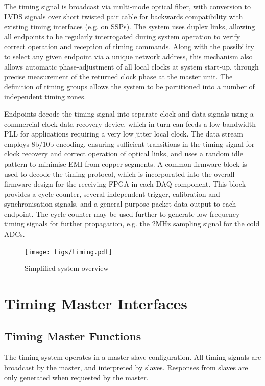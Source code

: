 \documentclass[a4paper,11pt]{article}
\begin{document}
The timing signal is broadcast via multi-mode optical fiber, with conversion to
LVDS signals over short twisted pair cable for backwards compatibility with existing
timing interfaces (e.g. on SSPs). The system uses duplex links, allowing all endpoints
to be regularly interrogated during system operation to verify correct operation
and reception of timing commands. Along with the possibility to select
any given endpoint via a unique network address, this mechanism also allows
automatic phase-adjustment of all local clocks at system start-up,
through precise measurement of the returned clock phase at the master unit. The definition
of timing groups allows the system to be partitioned into a number of
independent timing zones.

Endpoints decode the timing signal into separate clock and data
signals using a commercial clock-data-recovery device, which in turn
can feeds a low-bandwidth PLL for applications requiring a very low jitter local clock.
The data stream employs 8b/10b encoding, ensuring sufficient transitions in the
timing signal for clock recovery and correct operation of optical links, and uses a random idle 
pattern to minimise EMI from copper segments. A common firmware block is used to
decode the timing protocol, which is incorporated into the overall
firmware design for the receiving FPGA in each DAQ component. This
block provides a cycle counter, several independent trigger, calibration and 
synchronisation signals, and a general-purpose packet data output to each endpoint.
The cycle counter may be used further to generate low-frequency timing signals for
further propagation, e.g. the 2MHz sampling signal for the cold ADCs.

\begin{figure}[p]
	\centering
	\texttt{[image: figs/timing.pdf]}
	\caption{Simplified system overview}
	\label{fig:timing}
\end{figure}

\section{Timing Master Interfaces}

\subsection{Timing Master Functions}

The timing system operates in a master-slave configuration. All timing signals are broadcast by the master, and interpreted by slaves. Responses from slaves are only generated when requested by the master.
\end{document}
